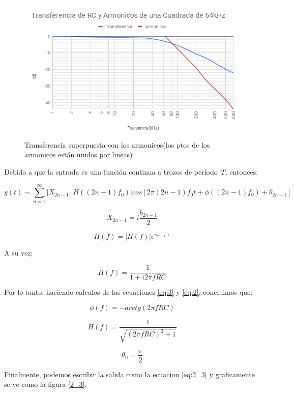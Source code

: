 \begin{figure}[H]
\begin{centering}
\includegraphics[scale=0.65]{../Ex2/resources2/Med_Arm} 
\par\end{centering}
\caption{Transferencia superpuesta con los armonicos(los ptos de los armonicos
están unidos por lineas)}
\end{figure}

Debido a que la entrada es una función continua a trozos de perí­odo
\emph{T, }entonces:

\[
y(t)\sim\sum_{n=1}^{\infty}\left|X_{2n-1}\right|\left|H\left((2n-1)f_{0}\right)\right|cos\left[2\pi(2n-1)f_{0}t+\phi((2n-1)f_{0})+\theta_{2n-1}\right]
\]

\begin{equation}
X_{2n-1}=i\frac{b_{2n-1}}{2}\label{eq:3}
\end{equation}

\[
H(f)=\left|H(f)\right|e^{i\phi(f)}
\]

A su vez;

\begin{equation}
H(f)=\frac{1}{1+i2\pi fRC}\label{eq:2}
\end{equation}

Por lo tanto, haciendo calculos de las ecuaciones \ref{eq:3} y \ref{eq:2},
concluimos que:

\[
\phi(f)=-arctg(2\pi fRC)
\]

\[
H(f)=\frac{1}{\sqrt{(2\pi fRC)^{2}+1}}
\]

\[
\theta_{n}=\frac{\pi}{2}
\]

Finalmente, podemos escribir la salida como la ecuacion \ref{eq:2_3}
y graficamente se ve como la figura \ref{2_3}.

